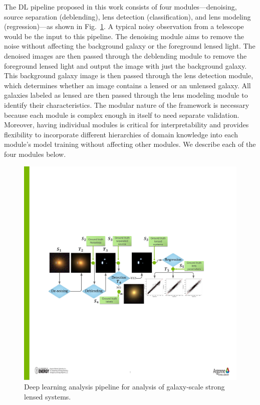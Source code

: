 \documentclass[12pt, twocolumn, apj]{openjournal}
\begin{document}
The DL pipeline proposed in this work consists of four modules---denoising, source separation (deblending), lens detection (classification), and lens modeling (regression)---as shown in Fig.~\ref{Fig:SL_pipeline_hor}. A typical noisy observation from a telescope would be the input to this pipeline. The denoising module aims to remove the noise without affecting the background galaxy or the foreground lensed light. The denoised images are then passed through the deblending module to remove the foreground lensed light and output the image with just the background galaxy. This background galaxy image is then passed through the lens detection module, which determines whether an image contains a lensed or an unlensed galaxy. All galaxies labeled as lensed are then passed through the lens modeling module to identify their characteristics. The modular nature of the framework is necessary because each module is complex enough in itself to need separate validation. 
Moreover, having individual modules is critical for interpretability and provides flexibility to incorporate different hierarchies of domain knowledge into each module's model 
training without affecting other modules. We describe each of the four modules below. 

\begin{figure}[tp]
\centering
\includegraphics[width=\linewidth]{Figures/SL_pipeline_model_V2.pdf}
\caption{Deep learning analysis pipeline for analysis of galaxy-scale strong lensed systems.}
\label{Fig:SL_pipeline_hor} 
\end{figure}
\end{document}

